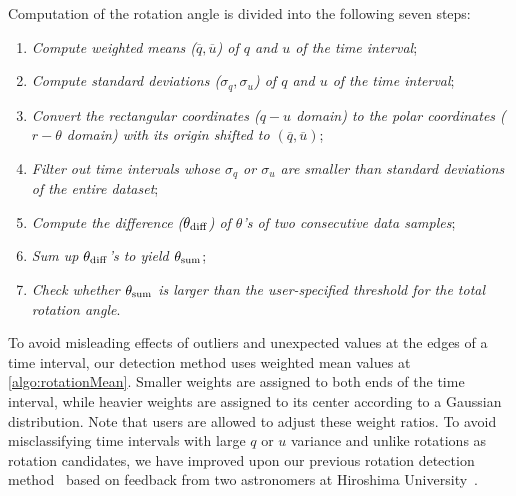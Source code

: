 Computation of the rotation angle is divided into the following seven steps:
\begin{enumerate}[nosep, label=\textsl{Step \arabic*}, align=parleft, leftmargin=*]
    \item \textsl{Compute weighted means ($\overline{q}, \overline{u}$) of $q$ and $u$ of the time interval};\label{algo:rotationMean}
    \item \textsl{Compute standard deviations ($\sigma_{q}, \sigma_{u}$) of $q$ and $u$ of the time interval}; \label{algo:rotationStd}
    \item \textsl{Convert the rectangular coordinates ($q-u$ domain) to the polar coordinates ($r - \theta$ domain) with its origin shifted to $(\overline{q}, \overline{u})$}; \label{algo:rotationPolar}
    \item \textsl{Filter out time intervals whose $\sigma_{q}$ or $\sigma_{u}$ are smaller than standard deviations of the entire dataset}; \label{algo:rotationFilter}
    \item \textsl{Compute the difference ($\theta_{\rm diff}$) of $\theta$'s of two consecutive data samples}; \label{algo:rotationDiff}
    \item \textsl{Sum up $\theta_{\rm diff}$'s to yield $\theta_{\rm sum}$}; \label{algo:rotationSum}
    \item \textsl{Check whether $\theta_{\rm sum}$ is larger than the user-specified threshold for the total rotation angle}. \label{algo:rotationThreshold}
\end{enumerate}
To avoid misleading effects of outliers and unexpected values at the edges of a time interval,
our detection method uses weighted mean values at \ref{algo:rotationMean}. Smaller weights are assigned to both ends of the time interval, 
while heavier weights are assigned to its center according to a Gaussian distribution. %
Note that users are allowed to adjust these weight ratios.
%
To avoid misclassifying time intervals with large $q$ or $u$ variance and unlike rotations as rotation candidates,
we have improved upon our previous rotation detection method~\cite{Sawada2018} based on feedback from two astronomers at Hiroshima University~\cite{Huang2019}.
%
